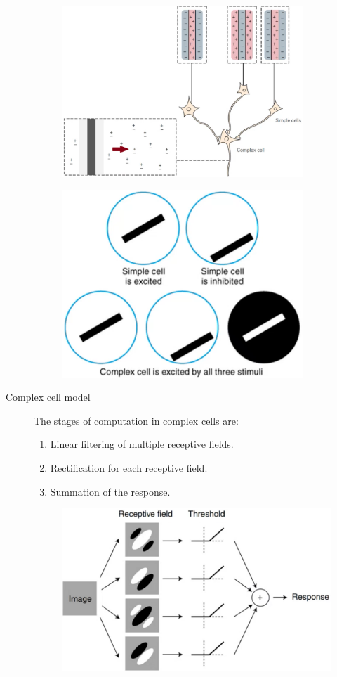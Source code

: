 \begin{figure}[H]
    \centering
    \begin{subfigure}{0.45\linewidth}
        \centering
        \includegraphics[width=0.9\linewidth]{./img/complex_cell.png}
    \end{subfigure}
    \begin{subfigure}{0.45\linewidth}
        \centering
        \includegraphics[width=0.6\linewidth]{./img/complex_cell_stimuli.png}
    \end{subfigure}
\end{figure}

\begin{description}
    \item[Complex cell model]
        The stages of computation in complex cells are:
        \begin{enumerate}
            \item Linear filtering of multiple receptive fields.
            \item Rectification for each receptive field.
            \item Summation of the response.
        \end{enumerate}

        \begin{figure}[H]
            \centering
            \includegraphics[width=0.4\linewidth]{./img/complex_cell_model.png}
        \end{figure}
\end{description}


